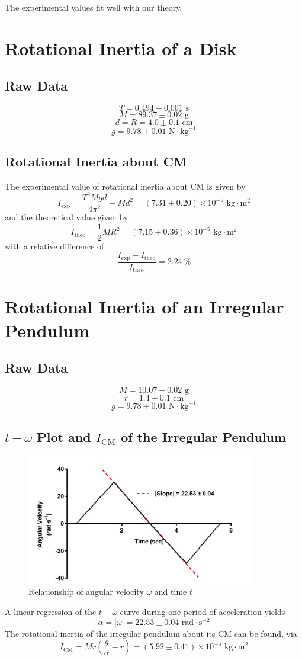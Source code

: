 The experimental values fit well with our theory.
 
\section{Rotational Inertia of a Disk}
\subsection{Raw Data}
$$T=0.494\pm0.001\text{ s}$$
$$M=89.37\pm0.02\text{ g}$$
$$d=R=4.0\pm0.1\text{ cm}$$
$$g=9.78\pm0.01\text{ N}\cdot \text{kg}^{-1}$$

\subsection{Rotational Inertia about CM}
The experimental value of rotational inertia about CM is given by
$$I_{\text{exp}}=
\frac{T^2Mgd}{4\pi^2}-Md^2=(7.31\pm 0.20) \times 10^{-5}\text{ kg}\cdot \text{m}^{2}
$$
and the theoretical value given by
$$I_{\text{theo}}=\frac12MR^2=(7.15\pm 0.36) \times 10^{-5}\text{ kg}\cdot \text{m}^{2}
$$
with a relative difference of
$$\frac{I_{\text{exp}}-I_{\text{theo}}}{I_{\text{theo}}}=2.24 \ \%$$


\section{Rotational Inertia of an Irregular Pendulum}
\subsection{Raw Data}
$$M=10.07\pm0.02\text{ g}$$
$$r=1.4\pm0.1\text{ cm}$$
$$g=9.78\pm0.01\text{ N}\cdot \text{kg}^{-1}$$
\subsection{$t-\omega$ Plot and $I_{\text{CM}}$ of the Irregular Pendulum}
\begin{figure}[H]
	\centering\includegraphics[width=10cm]{icm2}
	\caption{Relationship of angular velocity $\omega$ and time $t$ }
	\label{$Frequency-Intensity$ Graph for $70$cm tube}
\end{figure}

A linear regression of the $t-\omega$ curve during one period of acceleration yields
$$\alpha=|\dot{\omega}|=22.53\pm0.04\text{ rad}\cdot\text{s}^{-2}$$
The rotational inertia of the irregular pendulum about its CM can be found, via
$$I_{\text{CM}}=Mr(\frac{g}{\alpha}-r)=(5.92\pm0.41)\times 10^{-5}\text{ kg}\cdot \text{m}^{2}$$

